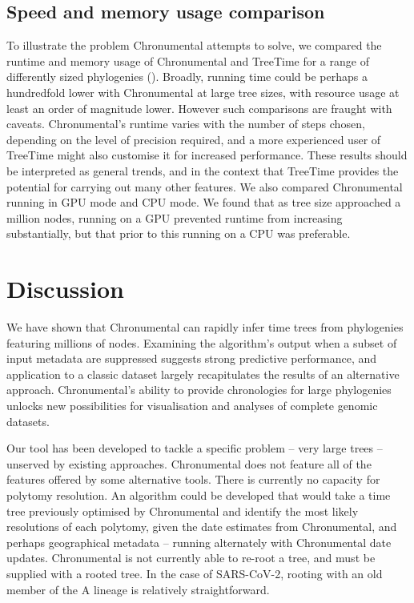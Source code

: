 \subsection*{Speed and memory usage comparison}
To illustrate the problem Chronumental attempts to solve, we compared the runtime and memory usage of Chronumental and TreeTime for a range of differently sized phylogenies (). Broadly, running time could be perhaps a hundredfold lower with Chronumental at large tree sizes, with resource usage at least an order of magnitude lower. However such comparisons are fraught with caveats. Chronumental's runtime varies with the number of steps chosen, depending on the level of precision required, and a more experienced user of TreeTime might also customise it for increased performance. These results should be interpreted as general trends, and in the context that TreeTime provides the potential for carrying out many other features. We also compared Chronumental running in GPU mode and CPU mode. We found that as tree size approached a million nodes, running on a GPU prevented runtime from increasing substantially, but that prior to this running on a CPU was preferable.




\section*{Discussion}

We have shown that Chronumental can rapidly infer time trees from phylogenies featuring millions of nodes. Examining the algorithm's output when a subset of input metadata are suppressed suggests strong predictive performance, and application to a classic dataset largely recapitulates the results of an alternative approach. Chronumental's ability to provide chronologies for large phylogenies unlocks new possibilities for visualisation and analyses of complete genomic datasets.

Our tool has been developed to tackle a specific problem -- very large trees -- unserved by existing approaches. Chronumental does not feature all of the features offered by some alternative tools. There is currently no capacity for polytomy resolution. An algorithm could be developed that would take a time tree previously optimised by Chronumental and identify the most likely resolutions of each polytomy, given the date estimates from Chronumental, and perhaps geographical metadata -- running alternately with Chronumental date updates.  Chronumental is not currently able to re-root a tree, and must be supplied with a rooted tree. In the case of SARS-CoV-2, rooting with an old member of the A lineage is relatively straightforward.

